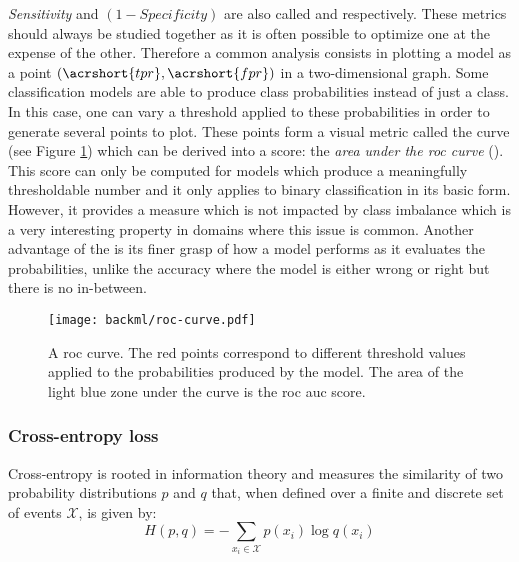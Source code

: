 \textit{Sensitivity} and $(1 - \textit{Specificity})$ are also called 
and  respectively. These metrics should always be studied together
as it is often possible to optimize one at the expense of the other. Therefore a
common analysis consists in plotting a model as a point $(\acrshort{tpr}, \acrshort{fpr})$
in a two-dimensional graph. Some classification models are able to produce class
probabilities instead of just a class. In this case, one can vary a threshold
applied to these probabilities in order to generate several points to plot. These
points form a visual metric called the  curve (see Figure
\ref{fig:backml:roc-curve}) which can be derived into a score: the
\textit{area under the \acrshort{roc} curve} (\rocauc). This
score can only be computed for models which produce a meaningfully
thresholdable number and it only applies to binary classification in its basic form.
However, it provides a measure which is not impacted by class imbalance which is
a very interesting property in domains where this issue is common. Another advantage
of the \rocaucs is its finer grasp of how a model performs as it evaluates
the probabilities, unlike the accuracy where the model is either wrong or right but
there is no in-between.

\begin{figure}
  \centering
  \texttt{[image: backml/roc-curve.pdf]}
  \caption{A \acrshort{roc} curve. The red points correspond to different threshold values applied to the probabilities produced by the model. The area of the light blue zone under the curve is the \acrshort{roc} \acrshort{auc} score.}
  \label{fig:backml:roc-curve}
\end{figure}


\subsubsection{Cross-entropy loss}
\label{sssec:backml:metric:crossentropy}

Cross-entropy is rooted in information theory and measures the similarity of two
probability distributions $p$ and $q$ that, when defined over a finite and discrete
set of events $\mathcal{X}$, is given by:
\begin{equation}
\label{eqn:backml:crossentropy}
H(p, q) = - \sum\limits_{x_i \in \mathcal{X}} p\left(x_i\right) \log q\left(x_i\right)
\end{equation}

